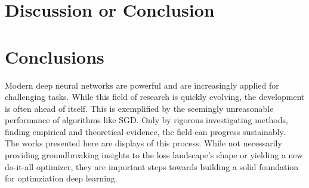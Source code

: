 \documentclass[a4paper]{scrartcl}
\begin{document}
\section*{Discussion or Conclusion}


\section{Conclusions}
\label{sec:conc}
Modern deep neural networks are powerful and are increasingly applied for challenging tasks. While this field of research is quickly evolving, the development is often ahead of itself. This is exemplified by the seemingly unreasonable performance of algorithms like SGD. Only by rigorous investigating methods, finding empirical and theoretical evidence, the field can progress sustainably.\\
The works presented here are displays of this process. While not necessarily providing groundbreaking insights to the loss landscape's shape or yielding a new do-it-all optimizer, they are important steps towards building a solid foundation for optimziation deep learning.



\newpage



	
\end{document}
